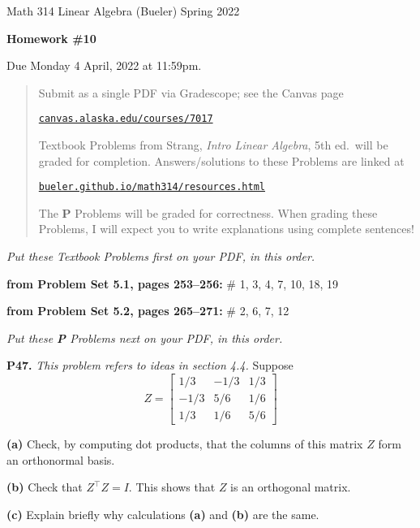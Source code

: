 \documentclass[12pt]{amsart}
\newcommand{\prob}[1]{\bigskip\noindent\textbf{#1.}\quad }
\newcommand{\probset}[2]{\bigskip\noindent\textbf{from Problem Set #1, pages #2:}\quad }
\newcommand{\epart}[1]{\medskip\noindent\textbf{(#1)}\quad }
\begin{document}
\scriptsize \noindent Math 314 Linear Algebra (Bueler) \hfill Spring 2022
\normalsize\medskip

\Large
\centerline{\textbf{Homework \#10}}

\bigskip
\large
\centerline{Due Monday 4 April, 2022 at 11:59pm.}

\normalsize
\bigskip
\begin{quote}
\medskip
\noindent Submit as a single PDF via Gradescope; see the Canvas page

\href{https://canvas.alaska.edu/courses/7017}{\texttt{canvas.alaska.edu/courses/7017}}

\noindent Textbook Problems from Strang, \emph{Intro Linear Algebra}, 5th ed.~will be graded for completion.  Answers/solutions to these Problems are linked at

\href{https://bueler.github.io/math314/resources.html}{\texttt{bueler.github.io/math314/resources.html}}

\noindent The \textbf{P} Problems will be graded for correctness.  When grading these Problems, I will expect you to write explanations using complete sentences!
\end{quote}
\medskip

\thispagestyle{empty}

\noindent \hrulefill

\noindent \emph{Put these Textbook Problems first on your PDF, in this order.}

\probset{5.1}{253--256} \# 1, 3, 4, 7, 10, 18, 19

\probset{5.2}{265--271} \# 2, 6, 7, 12


\bigskip
\noindent \hrulefill

\noindent \emph{Put these \textbf{P} Problems next on your PDF, in this order.}

\prob{P47} \emph{This problem refers to ideas in section 4.4.} \quad Suppose
  $$Z = \begin{bmatrix} 1/3 & -1/3 & 1/3 \\ -1/3 & 5/6 & 1/6 \\ 1/3 & 1/6 & 5/6 \end{bmatrix}$$ 

\epart{a}  Check, by computing dot products, that the columns of this matrix $Z$ form an orthonormal basis.

\epart{b}  Check that $Z^\top Z = I$.  This shows that $Z$ is an orthogonal matrix.

\epart{c}  Explain briefly why calculations \textbf{(a)} and \textbf{(b)} are the same.
\end{document}
